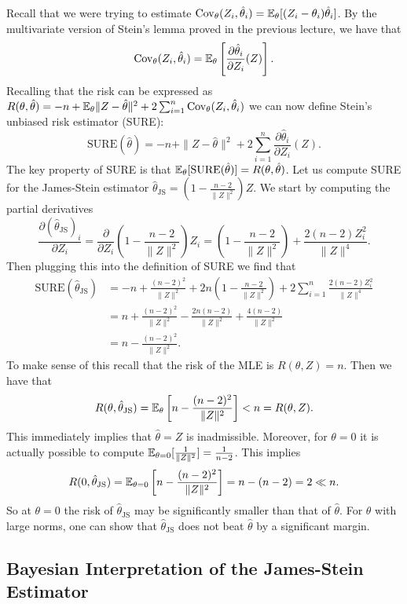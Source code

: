 Recall that we were trying to estimate $\operatorname{Cov}_\theta(Z_i, \hat{\theta}_i) = \mathbb{E}_\theta[(Z_i-\theta_i)\hat{\theta}_i]$. By the multivariate version of Stein's lemma proved in the previous lecture, we have that \[
	\operatorname{Cov}_\theta(Z_i, \hat{\theta}_i) = \mathbb{E}_\theta\left[ \frac{\partial \hat{\theta}_i}{\partial Z_i}(Z) \right].
\] Recalling that the risk can be expressed as $R(\theta, \hat \theta) = -n + \mathbb{E}_\theta \|Z - \hat \theta\|^2 + 2 \sum_{i=1}^n \operatorname{Cov}_\theta(Z_i, \hat \theta_i)$ we can now define Stein's unbiased risk estimator (SURE): \[
	\text{SURE}(\hat{\theta}) = -n + \|Z - \hat \theta\|^2 + 2 \sum_{i=1}^n \frac{\partial \hat{\theta}_i}{\partial Z_i}(Z).
\]
The key property of SURE is that $\mathbb{E}_\theta[\text{SURE}(\hat{\theta})] = R(\theta, \hat{\theta})$. Let us compute SURE for the James-Stein estimator \(
\hat{\theta}_{\text{JS}} = \left(1 - \frac{n-2}{\|Z\|^2}\right) Z.
\) We start by computing the partial derivatives \[
\frac{\partial (\hat{\theta}_{\text{JS}})_i}{\partial Z_i} = \frac{\partial }{\partial Z_i} \left(1 - \frac{n-2}{\|Z\|^2}\right) Z_i = \left(1 - \frac{n-2}{\|Z\|^2}\right) + \frac{2(n-2)Z_i^2}{\|Z\|^4}.
\] Then plugging this into the definition of SURE we find that 
\begin{align*}
	\text{SURE}(\hat{\theta}_{\text{JS}}) &= -n + \frac{(n-2)^2}{\|Z\|^2} + 2n \left(1 - \frac{n-2}{\|Z\|^2}\right) + 2\sum_{i=1}^n \frac{2(n-2)Z_i^2}{\|Z\|^4} \\
	&= n + \frac{(n-2)^2}{\|Z\|^2} - \frac{2n(n-2)}{\|Z\|^2} + \frac{4(n-2)}{\|Z\|^2} \\
	&= n - \frac{(n-2)^2}{\|Z\|^2}.
\end{align*}
To make sense of this recall that the risk of the MLE is $R(\theta, Z) = n$. Then we have that \[
	R(\theta, \hat{\theta}_{\text{JS}}) = \mathbb{E}_\theta\left[n - \frac{(n-2)^2}{\|Z\|^2}\right] < n = R(\theta, Z).
\] This immediately implies that $\hat \theta = Z$ is inadmissible. Moreover, for $\theta = 0$ it is actually possible to compute $\mathbb{E}_{\theta =0}[\frac{1}{\|Z\|^2}] = \frac{1}{n-2}$. This implies \[
	R(0, \hat{\theta}_{\text{JS}}) = \mathbb{E}_{\theta = 0}\left[n - \frac{(n-2)^2}{\|Z\|^2}\right] = n - (n-2) = 2 \ll n.
\] So at $\theta = 0$ the risk of $\hat{\theta}_{\text{JS}}$ may be significantly smaller than that of $\hat \theta$. For $\theta$ with large norms, one can show that $\hat{\theta}_{\text{JS}}$ does not beat $\hat \theta$ by a significant margin.

\subsection{Bayesian Interpretation of the James-Stein Estimator}

